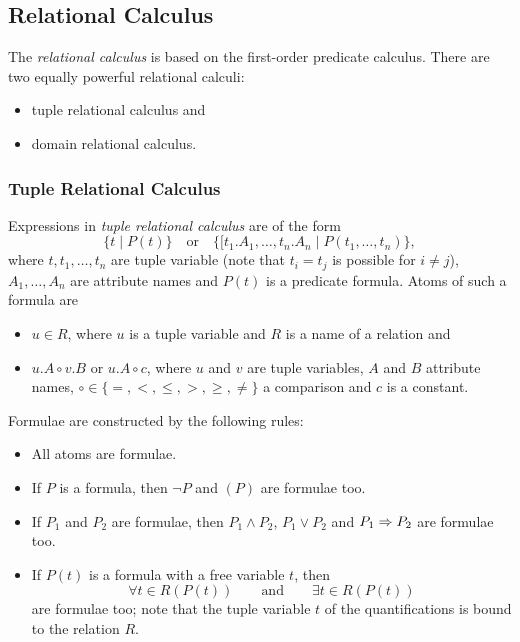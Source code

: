 \subsection{Relational Calculus}

The \emph{relational calculus} is based on the first-order predicate calculus. There are two equally powerful relational calculi:

\begin{itemize}
\item tuple relational calculus and
\item domain relational calculus.
\end{itemize}




\subsubsection{Tuple Relational Calculus}

Expressions in \emph{tuple relational calculus} are of the form
\[
\{ t \mid P(t) \}
\quad\text{or}\quad
\{ [t_1.A_1,\ldots,t_n.A_n \mid P(t_1,\ldots,t_n) \}
,\]
where $t,t_1,\ldots,t_n$ are tuple variable (note that $t_i=t_j$ is possible for $i\neq j$), $A_1,\ldots,A_n$ are attribute names and $P(t)$ is a predicate formula. Atoms of such a formula are
\begin{itemize}
\item $u \in R$, where $u$ is a tuple variable and $R$ is a name of a relation and
\item $u.A \circ v.B$ or $u.A \circ c$, where $u$ and $v$ are tuple variables, $A$ and $B$ attribute names, $\circ \in \{=,<,\leq,>,\geq,\neq\}$ a comparison and $c$ is a constant.
\end{itemize}

Formulae are constructed by the following rules:
\begin{itemize}
\item
	All atoms are formulae.
\item
	If $P$ is a formula, then $\neg P$ and $(P)$ are formulae too.
\item
	If $P_1$ and $P_2$ are formulae, then $P_1 \wedge P_2$, $P_1 \vee P_2$ and $P_1 \Rightarrow P_2$ are formulae too.
\item
	If $P(t)$ is a formula with a free variable $t$, then
	\[
	\forall t \in R(P(t))
	\qquad\text{and}\qquad
	\exists t \in R(P(t))
	\]
are formulae too; note that the tuple variable $t$ of the quantifications is bound to the relation $R$.
\end{itemize}

